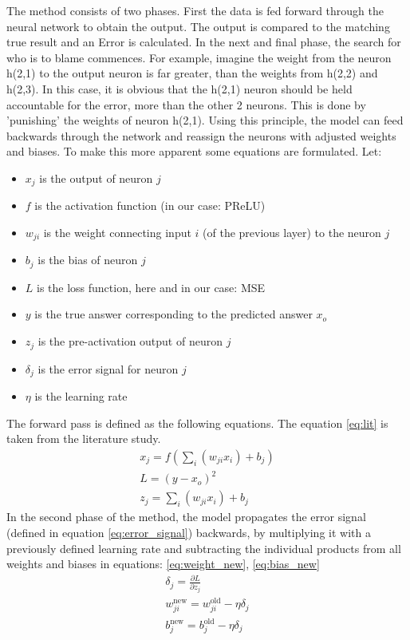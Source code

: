 \documentclass{article}
\begin{document}
The method consists of two phases. First the data is fed forward through the neural network to obtain the output. The output is compared to the matching true result and an Error is calculated.
In the next and final phase, the search for who is to blame commences. For example, imagine the weight from the neuron h(2,1) to the output neuron is far greater, than the weights from h(2,2) and h(2,3). In this case, it is obvious that the h(2,1) neuron should be held accountable for the error, more than the other 2 neurons. This is done by 'punishing' the weights of neuron h(2,1).
Using this principle, the model can feed backwards through the network and reassign the neurons with adjusted weights and biases.
\newpage
To make this more apparent some equations are formulated. Let:
\begin{itemize}
    \item $x_j$ is the output of neuron $j$
    \item $f$ is the activation function (in our case: PReLU)
    \item $w_{ji}$ is the weight connecting input $i$ (of the previous layer) to the neuron $j$
    \item $b_j$ is the bias of neuron $j$
    \item $L$ is the loss function, here and in our case: MSE
    \item $y$ is the true answer corresponding to the predicted answer $x_o$
    \item $z_j$ is the pre-activation output of neuron $j$
    \item $\delta_j$ is the error signal for neuron $j$
    \item $\eta$ is the learning rate
\end{itemize}


The forward pass is defined as the following equations. The equation \eqref{eq:lit} is taken from the literature study.
\begin{gather}
x_j = f\left(\sum_i (w_{ji} x_i) + b_j\right) \label{eq:lit} \\
L = (y - x_o)^2 \\
z_j = \sum_i (w_{ji} x_i) + b_j
\end{gather}
In the second phase of the method, the model propagates the error signal (defined in equation \eqref{eq:error_signal}) backwards, by multiplying it with a previously defined learning rate and subtracting the individual products from all weights and biases in equations: \eqref{eq:weight_new}, \eqref{eq:bias_new}
\begin{gather}
\delta_j = \frac{\partial L}{\partial z_j} \label{eq:error_signal} \\
w_{ji}^{\text{new}} = w_{ji}^{\text{old}} - \eta \delta_j \label{eq:weight_new} \\
b_{j}^{\text{new}} = b_{j}^{\text{old}} - \eta \delta_j \label{eq:bias_new}
\end{gather}
\end{document}
